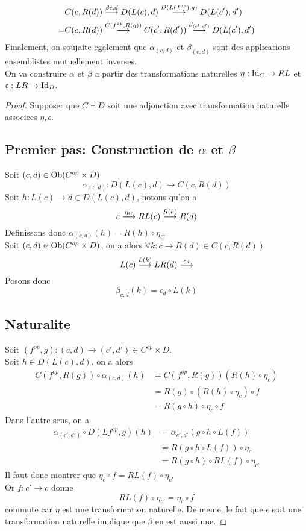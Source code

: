 \documentclass[../main.tex]{subfiles}
\begin{document}
\begin{align*}
	&C(  c ,R( d )) \overset{ \beta{c,d} }{\longrightarrow} D( L( c) ,d)  \overset{ D( L( f^{op} ), g ) 	 }{\longrightarrow} D( L( c') ,d')   \\
	=& C( c,R( d) )	\overset{ C( f^{op},R( g) )  }{\longrightarrow} C( c',R( d') )  \overset{ \beta_{( c',d') } }{\longrightarrow} D( L( c') ,d') 
\end{align*}
Finalement, on soujaite egalement que $\alpha_{( c,d) } $ et $\beta_{ ( c,d) } $ sont des applications ensemblistes mutuellement inverses.\\
On va construire $\alpha$ et $\beta$ a partir des transformations naturelles $ \eta: \operatorname{Id}_C \to RL$ et $\epsilon: LR\to \operatorname{Id}_D$.\\
\begin{proof}
Supposer que $C\dashv D$ soit une adjonction avec transformation naturelle associees $\eta,\epsilon$.
\subsection*{Premier pas: Construction de $\alpha$ et $\beta$ }
Soit $( c,d) \in \operatorname{Ob} ( C^{op}\times D) $ 
\[ 
	\alpha_{( c,d) } : D( L( c) ,d) \to C( c,R( d) ) 
\]
Soit $h: L( c) \to d \in D( L( c) ,d) $, notons qu'on a
\[ 
	c \overset{ \eta_C}{\longrightarrow} RL( c) \overset{ R( h) }{\longrightarrow} R( d) 
\]
Definissons donc $\alpha_{( c,d) } ( h) = R( h) \circ \eta_C$ \\
\hr
Soit $( c,d) \in \operatorname{Ob} ( C^{op}\times D) $, on a alors $\forall k :c \to R( d) \in C( c,R( d) ) $ 
\[ 
	L( c) \overset{ L( k) }{\longrightarrow} LR( d) \overset{ \epsilon_d}{\longrightarrow} 
\]
Posons donc
\[ 
	\beta_{c,d} ( k) = \epsilon_d \circ L( k) 
\]

\subsection*{Naturalite}
Soit $( f^{op},g) : ( c,d) \to ( c',d') \in C^{op}\times D$.\\
Soit $h \in D( L( c) ,d) $, on a alors
\begin{align*}
	C( f^{op},R( g) ) \circ \alpha_{ ( c,d) } ( h) &= C( f^{op},R( g) ) ( R( h) \circ \eta_c) \\
						       &= R( g) \circ  ( R( h) \circ \eta_c) \circ f\\
						       &= R( g\circ h ) \circ \eta_c \circ f
\end{align*}
Dans l'autre sens, on a
\begin{align*}
	\alpha_{ ( c',d') } \circ D( Lf^{op},g) ( h) &= \alpha_{c',d'} ( g\circ h \circ L( f) ) \\
						     &= R( g \circ h \circ L( f) ) \circ \eta_c\\
						     &= R( g\circ h) \circ RL( f) \circ \eta_{c'} 
\end{align*}
Il faut donc montrer que $\eta_c\circ f = RL( f) \circ \eta_{c'} $ \\
Or $f:c'\to c$ donne 
\[ 
	RL( f) \circ \eta_{c'} = \eta_c \circ f
\]
commute car $\eta$ est une transformation naturelle.
De meme, le fait que $\epsilon$ soit une transformation naturelle implique que $\beta$ en est aussi une.

\end{proof}
\end{document}
